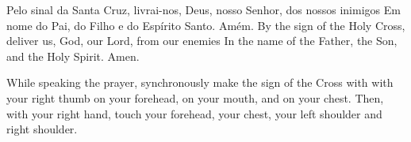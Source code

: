  \beginverse
    Pelo sinal da Santa Cruz,
    livrai-nos, Deus, nosso Senhor,
    dos nossos inimigos
    \parspace
    Em nome do Pai,
    do Filho e
    do Espírito Santo.
    \parspace
    Amém.
  \endverse
  \beginverse
    By the sign of the Holy Cross,
    deliver us, God, our Lord,
    from our enemies
    \parspace
    In the name of the Father,
    the Son, and
    the Holy Spirit.
    \parspace
    Amen.
  \endverse
  \begin{note}
    While speaking the prayer, synchronously make
    the sign of the Cross with with your right thumb
    on your forehead,
    on your mouth, and
    on your chest.
    \parspace
    Then, with your right hand, touch
    your forehead,
    your chest,
    your left shoulder and right shoulder.
  \end{note}
\endsong

